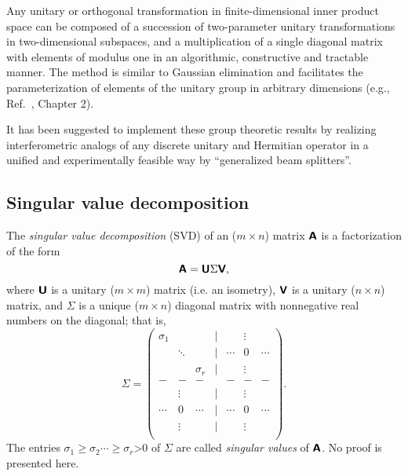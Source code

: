 Any unitary or orthogonal transformation   in finite-dimensional inner product space
can be composed of a succession of two-parameter unitary transformations in
two-dimensional subspaces,
and a multiplication of a single diagonal matrix with elements of modulus one
in an algorithmic, constructive and tractable manner.
The method is similar to Gaussian elimination and facilitates the parameterization of elements
of the unitary group in arbitrary dimensions (e.g., Ref.~\cite[-30mm]{murnaghan}, Chapter 2).

{\color{Purple}
It has been suggested to implement
these group theoretic results by realizing interferometric analogs
of any discrete unitary and Hermitian operator
in a unified and experimentally feasible way by ``generalized beam splitters''\cite[-30mm]{rzbb,reck-94}.}


\subsection{Singular value decomposition}

The {\em singular value decomposition}
(SVD)
of an ($m\times n$)  matrix $\textsf{\textbf{A}}$ is a factorization of the form
\begin{equation}
\textsf{\textbf{A}} = \textsf{\textbf{U}} \Sigma \textsf{\textbf{V}} ,
\end{equation}
where
$\textsf{\textbf{U}}$ is a unitary ($m\times m$)  matrix (i.e. an isometry),
$\textsf{\textbf{V}}$ is a unitary ($n\times n$)  matrix,
and
$\Sigma$ is a unique ($m\times n$)   diagonal matrix with nonnegative real numbers on the diagonal;
that is,
\begin{equation}
\Sigma =
\begin{pmatrix}
\sigma_1&&&{|}&&\vdots& \\
  &\ddots &&{|}&\cdots &0&\cdots \\
&&\sigma_r&{|}&&\vdots& \\
-&-&-&&-&-&- \\
&\vdots&&{|}&&\vdots& \\
\cdots &0&\cdots &{|}&\cdots &0&\cdots \\
&\vdots&&{|}&&\vdots& \\
\end{pmatrix}.
\end{equation}
The entries $\sigma_1\ge \sigma_2 \cdots \ge \sigma_r$>0 of $\Sigma$ are called {\em singular values}
of $\textsf{\textbf{A}}$.  No proof is presented here.

